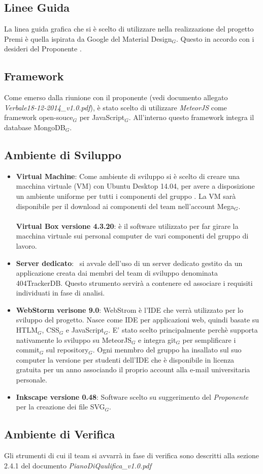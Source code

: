 \subsection{Linee Guida}
La linea guida grafica che si è scelto di utilizzare nella realizzazione del progetto Premi è quella ispirata da Google del Material Design$_G$. Questo in accordo con i desideri del Proponente \Zucchetti.
\subsection{Framework}
Come emerso dalla riunione con il proponente (vedi documento allegato \textit{Verbale18-12-2014\_v1.0.pdf}), è stato scelto di utilizzare \textit{MeteorJS} come framework open-souce$_G$ per JavaScript$_G$. All'interno questo framework integra il database MongoDB$_G$.

\subsection{Ambiente di Sviluppo}

\begin{itemize}
	\item \textbf{Virtual Machine}:
	\smallbreak
	Come ambiente di sviluppo si è scelto di creare una macchina virtuale (VM) con Ubuntu Desktop 14.04, per avere a disposizione un ambiente uniforme per tutti i componenti del gruppo \gruppo. La VM sarà disponibile per il download ai componenti del team nell'account Mega$_G$.
	\\ \\
	\textbf{Virtual Box versione 4.3.20}: è il software utilizzato per far girare la macchina virtuale sui personal computer de vari componenti del gruppo di lavoro.
	\item \textbf{Server dedicato}:
	\gruppo\ si avvale dell'uso di un server dedicato gestito da un applicazione creata dai membri del team di sviluppo denominata 404TrackerDB. Questo strumento servirà a contenere ed associare i requisiti individuati in fase di analisi.
    \item \textbf{WebStorm verisone 9.0}: WebStrom è l'IDE che verrà utilizzato per lo sviluppo del progetto. Nasce come IDE per applicazioni web, quindi basate su HTLM$_G$, CSS$_G$ e JavaScript$_G$. E' stato scelto principalmente perchè supporta nativamente lo sviluppo su MeteorJS$_G$ e integra git$_G$ per semplificare i commit$_G$ sul repository$_G$. Ogni menmbro del gruppo ha insallato sul suo computer la versione per studenti dell'IDE che è disponibile in licenza gratuita per un anno associando il proprio account alla e-mail universitaria personale.
    
    \item \textbf{Inkscape versione 0.48}: Software scelto su suggerimento del \textit{Proponente} per la creazione dei file SVG$_G$.
\end{itemize}

\subsection{Ambiente di Verifica}
Gli strumenti di cui il team si avvarrà in fase di verifica sono descritti alla sezione 2.4.1 del documento \textit{PianoDiQaulifica\_v1.0.pdf}